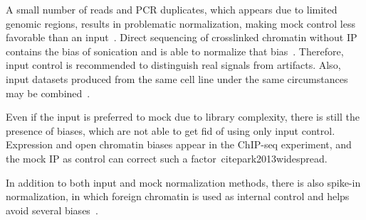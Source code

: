  A small number of reads and PCR duplicates, which appears due to limited genomic regions, results in problematic normalization, making mock control less favorable than an input~\cite{kidder2011chip}. 
 Direct sequencing of crosslinked chromatin without IP contains the bias of sonication and is able to normalize that bias~\cite{kharchenko2008design}. 
 Therefore, input control is recommended to distinguish real signals from artifacts. 
 Also, input datasets produced from the same cell line under the same circumstances may be combined~\cite{meyer2014identifying}.

 Even if the input is preferred to mock due to library complexity, there is still the presence of biases, which are not able to get fid of using only input control. 
 Expression and open chromatin biases appear in the ChIP-seq experiment, and the mock IP as control can correct such a factor~cite{park2013widespread}.

 In addition to both input and mock normalization methods, there is also spike-in normalization, in which foreign chromatin is used as internal control and helps avoid several biases~\cite{bonhoure2014quantifying}.

